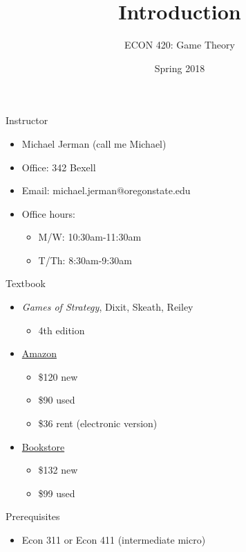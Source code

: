 \documentclass[10pt]{beamer}
\author{ECON 420: Game Theory}
\date{Spring 2018}
\title{Introduction}
\begin{document}
\maketitle

\begin{frame}[label={sec:org8f2a5e4}]{}
\alert{Instructor}
\begin{itemize}
\item Michael Jerman (call me Michael)
\item Office: 342 Bexell
\item Email: michael.jerman@oregonstate.edu
\item Office hours:
\begin{itemize}
\item M/W: 10:30am-11:30am
\item T/Th: 8:30am-9:30am
\end{itemize}
\end{itemize}
\end{frame}

\begin{frame}[label={sec:org88473fa}]{}
\alert{Textbook}
\begin{itemize}
\item \emph{Games of Strategy}, Dixit, Skeath, Reiley
\begin{itemize}
\item 4th edition
\end{itemize}
\item \href{https://www.amazon.com/Games-Strategy-Fourth-Avinash-Dixit/dp/0393919684/}{Amazon}
\begin{itemize}
\item \$120 new
\item \$90 used
\item \$36 rent (electronic version)
\end{itemize}
\item \href{http://verbacompare.osubeaverstore.com/compare/2018-Spring\_\_ECON\_\_420\_\_001}{Bookstore}
\begin{itemize}
\item \$132 new
\item \$99 used
\end{itemize}
\end{itemize}
\end{frame}

\begin{frame}[label={sec:org73cfe75}]{}
\alert{Prerequisites}
\begin{itemize}
\item Econ 311 or Econ 411 (intermediate micro)
\end{itemize}
\end{frame}
\end{document}
